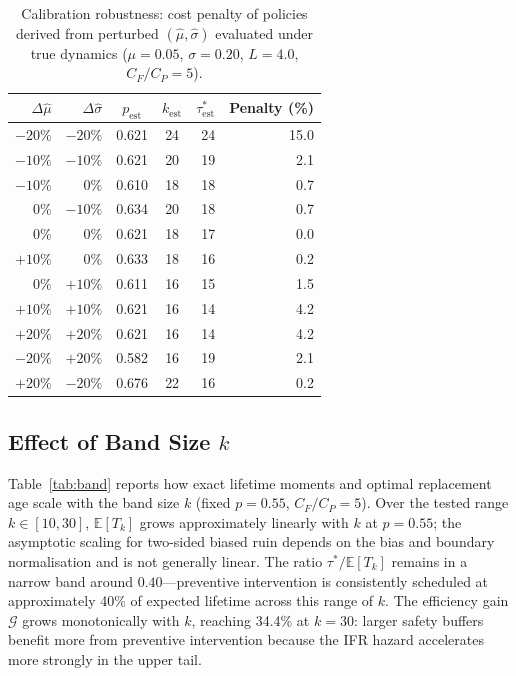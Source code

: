 \documentclass[pdflatex,sn-mathphys-num]{sn-jnl}
\theoremstyle{definition}
\newcommand{\E}{\mathbb{E}}
\numberwithin{equation}{section}
\begin{document}
\begin{table}[htbp]
\centering
\caption{Calibration robustness: cost penalty of policies derived from perturbed $(\hat\mu,\hat\sigma)$ evaluated under true dynamics ($\mu{=}0.05$, $\sigma{=}0.20$, $L{=}4.0$, $C_F/C_P{=}5$).}
\label{tab:calib_robust}
\small
\begin{tabular}{rrccrr}
\toprule
$\Delta\hat\mu$ & $\Delta\hat\sigma$ & $p_{\mathrm{est}}$ & $k_{\mathrm{est}}$ & $\tau^*_{\mathrm{est}}$ & Penalty (\%) \\
\midrule
$-20\%$ & $-20\%$ & 0.621 & 24 & 24 & 15.0 \\
$-10\%$ & $-10\%$ & 0.621 & 20 & 19 & 2.1 \\
$-10\%$ & $0\%$   & 0.610 & 18 & 18 & 0.7 \\
$0\%$   & $-10\%$ & 0.634 & 20 & 18 & 0.7 \\
$0\%$   & $0\%$   & 0.621 & 18 & 17 & 0.0 \\
$+10\%$ & $0\%$   & 0.633 & 18 & 16 & 0.2 \\
$0\%$   & $+10\%$ & 0.611 & 16 & 15 & 1.5 \\
$+10\%$ & $+10\%$ & 0.621 & 16 & 14 & 4.2 \\
$+20\%$ & $+20\%$ & 0.621 & 16 & 14 & 4.2 \\
$-20\%$ & $+20\%$ & 0.582 & 16 & 19 & 2.1 \\
$+20\%$ & $-20\%$ & 0.676 & 22 & 16 & 0.2 \\
\bottomrule
\end{tabular}
\end{table}

\subsection{Effect of Band Size $k$}

Table~\ref{tab:band} reports how exact lifetime moments and optimal replacement age scale with the band size $k$ (fixed $p{=}0.55$, $C_F/C_P{=}5$). Over the tested range $k\in[10,30]$, $\E[T_k]$ grows approximately linearly with $k$ at $p=0.55$; the asymptotic scaling for two-sided biased ruin depends on the bias and boundary normalisation and is not generally linear. The ratio $\tau^*/\E[T_k]$ remains in a narrow band around $0.40$---preventive intervention is consistently scheduled at approximately 40\% of expected lifetime across this range of $k$. The efficiency gain $\mathcal{G}$ grows monotonically with $k$, reaching 34.4\% at $k=30$: larger safety buffers benefit more from preventive intervention because the IFR hazard accelerates more strongly in the upper tail.
\end{document}
